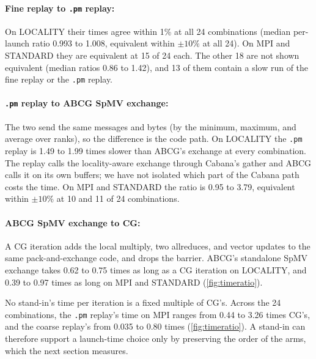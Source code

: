 \documentclass[11pt]{article}
\newcommand{\pmrep}{\texttt{.pm} replay}
\begin{document}
\paragraph{Fine replay to \pmrep:} On LOCALITY their times agree within 1\% at all 24
combinations (median per-launch ratio 0.993 to 1.008, equivalent within $\pm 10\%$ at
all 24). On MPI and STANDARD they are equivalent at 15 of 24 each. The other 18 are not
shown equivalent (median ratios 0.86 to 1.42), and 13 of them contain a slow run of the
fine replay or the \pmrep.

\paragraph{\pmrep{} to ABCG SpMV exchange:} The two send the same messages and bytes
(by the minimum, maximum, and average over ranks), so the difference is the code path.
On LOCALITY the \pmrep{} is 1.49 to 1.99 times slower than ABCG's exchange at every
combination. The replay calls the locality-aware exchange through Cabana's gather and
ABCG calls it on its own buffers; we have not isolated which part of the Cabana path
costs the time. On MPI and STANDARD the ratio is 0.95 to 3.79, equivalent within
$\pm 10\%$ at 10 and 11 of 24 combinations.

\paragraph{ABCG SpMV exchange to CG:} A CG iteration adds the local multiply, two
allreduces, and vector updates to the same pack-and-exchange code, and drops the
barrier. ABCG's standalone SpMV exchange takes 0.62 to 0.75 times as long as a CG
iteration on LOCALITY, and 0.39 to 0.97 times as long on MPI and STANDARD
(\cref{fig:timeratio}).

No stand-in's time per iteration is a fixed multiple of CG's. Across the 24
combinations, the \pmrep's time on MPI ranges from 0.44 to 3.26 times CG's, and the
coarse replay's from 0.035 to 0.80 times (\cref{fig:timeratio}). A stand-in can
therefore support a launch-time choice only by preserving the order of the arms, which
the next section measures.
\end{document}
